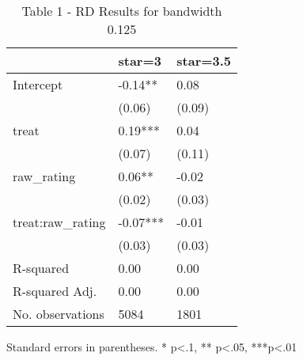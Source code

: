 \begin{table}
\caption{Table 1 - RD Results for bandwidth 0.125}
\label{}
\begin{center}
\begin{tabular}{lll}
\hline
                  & star=3   & star=3.5  \\
\hline
Intercept         & -0.14**  & 0.08      \\
                  & (0.06)   & (0.09)    \\
treat             & 0.19***  & 0.04      \\
                  & (0.07)   & (0.11)    \\
raw\_rating       & 0.06**   & -0.02     \\
                  & (0.02)   & (0.03)    \\
treat:raw\_rating & -0.07*** & -0.01     \\
                  & (0.03)   & (0.03)    \\
R-squared         & 0.00     & 0.00      \\
R-squared Adj.    & 0.00     & 0.00      \\
No. observations  & 5084     & 1801      \\
\hline
\end{tabular}
\end{center}
\end{table}
\bigskip
Standard errors in parentheses. \newline 
* p<.1, ** p<.05, ***p<.01